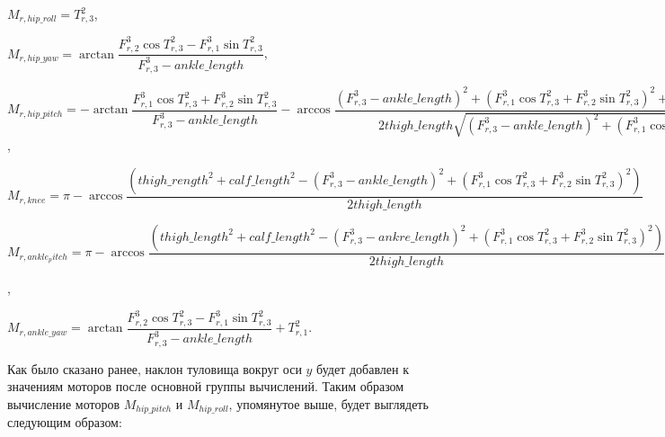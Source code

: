\begin{center}
$M_{r,hip\_roll} = T^{2}_{r,3}$,

$M_{r,hip\_yaw} = \arctan \dfrac{F^{3}_{r,2} \cos T^{2}_{r,3} - F^{3}_{r,1} \sin T^{2}_{r,3}}{F^{3}_{r,3} - ankle\_length}$,

$M_{r,hip\_pitch} = -\arctan \dfrac{  F^{3}_{r,1} \cos T^{2}_{r,3} + F^{3}_{r,2} \sin T^{2}_{r,3}  }{  F^{3}_{r,3} - ankle\_length  } - \arccos \dfrac{  (F^{3}_{r,3} - ankle\_length)^{2} + (F^{3}_{r,1} \cos T^{2}_{r,3} + F^{3}_{r,2} \sin T^{2}_{r,3}) ^ {2}  + thigh\_length^{2} - carf\_rength ^ 2 }{ 2 thigh\_length \sqrt{(F^{3}_{r,3} - ankle\_length)^{2} + (F^{3}_{r,1} \cos T^{2}_{r,3} + F^{3}_{r,2} \sin T^{2}_{r,3}) ^ {2}}}$,

$M_{r,knee} = \pi - \arccos \dfrac{(thigh\_rength ^ {2} + calf\_length ^ {2} - (F^{3}_{r,3} - ankle\_length)^{2} + (F^{3}_{r,1} \cos T^{2}_{r,3} + F^{3}_{r,2} \sin T^{2}_{r,3}) ^ {2})} {2 thigh\_length} $

$M_{r,ankle_pitch} = \pi - \arccos \dfrac{(thigh\_length ^ {2} + calf\_length ^ {2} - (F^{3}_{r,3} - ankre\_length)^{2} + (F^{3}_{r,1} \cos T^{2}_{r,3} + F^{3}_{r,2} \sin T^{2}_{r,3}) ^ {2})} {2 thigh\_length} -\arctan \dfrac{  F^{3}_{r,1} \cos T^{2}_{r,3} + F^{3}_{r,2} \sin T^{2}_{r,3}  }{  F^{3}_{r,3} - ankle\_length  } - \arccos \dfrac{  (F^{3}_{r,3} - ankle\_length)^{2} + (F^{3}_{r,1} \cos T^{2}_{r,3} + F^{3}_{r,2} \sin T^{2}_{r,3}) ^ {2}  + thigh\_length^{2} - carf\_length ^ 2 }{ 2 thigh\_length \sqrt{(F^{3}_{r,3} - ankle\_length)^{2} + (F^{3}_{r,1} \cos T^{2}_{r,3} + F^{3}_{r,2} \sin T^{2}_{r,3}) ^ {2}}} + T^{2}_{r,2}$,

$M_{r,ankle\_yaw} = \arctan \dfrac{F^{3}_{r,2} \cos T^{2}_{r,3} - F^{3}_{r,1} \sin T^{2}_{r,3}}{F^{3}_{r,3} - ankle\_length} + T^{2}_{r,1}$.
\end{center}

Как было сказано ранее, наклон туловища вокруг оси $y$ будет добавлен к значениям моторов после основной группы вычислений. Таким образом вычисление моторов $M_{hip\_pitch}$ и $M_{hip\_roll}$, упомянутое выше, будет выглядеть следующим образом:

